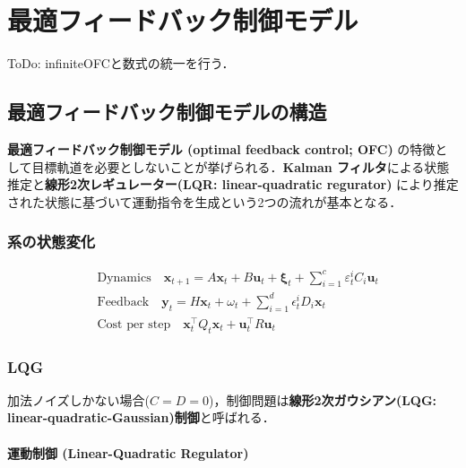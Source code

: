 \section{最適フィードバック制御モデル}
ToDo: infiniteOFCと数式の統一を行う．

\subsection{最適フィードバック制御モデルの構造}
\textbf{最適フィードバック制御モデル (optimal feedback control; OFC)} の特徴として目標軌道を必要としないことが挙げられる．\textbf{Kalman フィルタ}による状態推定と\textbf{線形2次レギュレーター(LQR: linear-quadratic regurator)} により推定された状態に基づいて運動指令を生成という2つの流れが基本となる．
\subsubsection{系の状態変化}


\begin{align}
&\text {Dynamics} \quad \mathbf{x}_{t+1}=A \mathbf{x}_{t}+B \mathbf{u}_{t}+\boldsymbol{\xi}_{t}+\sum_{i=1}^{c} \varepsilon_{t}^{i} C_{i} \mathbf{u}_{t}\\
&\text {Feedback} \quad \mathbf{y}_{t}=H \mathbf{x}_{t}+\omega_{t}+\sum_{i=1}^{d} \epsilon_{t}^{i} D_{i} \mathbf{x}_{t}\\
&\text{Cost per step}\quad \mathbf{x}_{t}^\top Q_{t} \mathbf{x}_{t}+\mathbf{u}_{t}^\top R \mathbf{u}_{t}
\end{align}


\subsubsection{LQG}
加法ノイズしかない場合($C=D=0$)，制御問題は\textbf{線形2次ガウシアン(LQG: linear-quadratic-Gaussian)制御}と呼ばれる．


\paragraph{運動制御 (Linear-Quadratic Regulator)}


